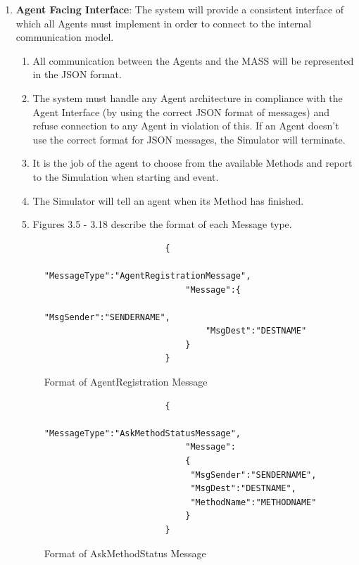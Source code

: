 \begin{enumerate}
  \item\textbf{Agent Facing Interface}: The system will provide a consistent interface of which all Agents must implement in order to connect to the internal communication model.
  \begin{enumerate}
    \item All communication between the Agents and the MASS will be represented in the JSON format.
    \item The system must handle any Agent architecture in compliance with the Agent Interface (by using the correct JSON format of messages) and refuse connection to any Agent in violation of this. If an Agent doesn't use the correct format for JSON messages, the Simulator will terminate.
    \item It is the job of the agent to choose from the available Methods and report to the Simulation when starting and event.
    \item The Simulator will tell an agent when its Method has finished.
    \item Figures 3.5 - 3.18 describe the format of each Message type.
    \end{enumerate}
    

\begin{figure}[H]
\centering
\begin{verbatim}
                        {	
	                        "MessageType":"AgentRegistrationMessage",
 	                        "Message":{
 		                        "MsgSender":"SENDERNAME",
 		                        "MsgDest":"DESTNAME"
 	                        }
                        }
\end{verbatim}
\caption{Format of AgentRegistration Message}
\label{fig:AgentRegistration}
\end{figure}


\begin{figure}[H]
\centering
\begin{verbatim}
                        {	
                        	"MessageType":"AskMethodStatusMessage",
                         	"Message":
                         	{
                             "MsgSender":"SENDERNAME",
                             "MsgDest":"DESTNAME",
                             "MethodName":"METHODNAME"
	                        }
                        }
\end{verbatim}
\caption{Format of AskMethodStatus Message}
\label{fig:AskMethodStatus}
\end{figure}


\end{enumerate}
